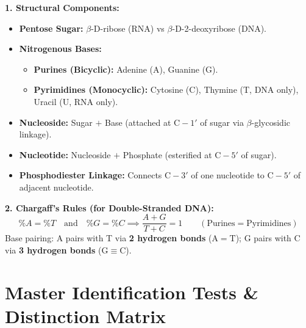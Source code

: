 \documentclass[10pt,a4paper]{article}
\begin{document}
\begin{formulabox}
\textbf{1. Structural Components:}
\begin{itemize}
  \item \textbf{Pentose Sugar:} $\beta$-D-ribose (RNA) vs $\beta$-D-2-deoxyribose (DNA).
  \item \textbf{Nitrogenous Bases:}
  \begin{itemize}
    \item \textbf{Purines (Bicyclic):} Adenine (A), Guanine (G).
    \item \textbf{Pyrimidines (Monocyclic):} Cytosine (C), Thymine (T, DNA only), Uracil (U, RNA only).
  \end{itemize}
  \item \textbf{Nucleoside:} Sugar $+$ Base (attached at $\mathrm{C-1'}$ of sugar via $\beta$-glycosidic linkage).
  \item \textbf{Nucleotide:} Nucleoside $+$ Phosphate (esterified at $\mathrm{C-5'}$ of sugar).
  \item \textbf{Phosphodiester Linkage:} Connects $\mathrm{C-3'}$ of one nucleotide to $\mathrm{C-5'}$ of adjacent nucleotide.
\end{itemize}
\textbf{2. Chargaff's Rules (for Double-Stranded DNA):}
\begin{equation}
  \%A = \%T \quad \text{and} \quad \%G = \%C \implies \frac{A+G}{T+C} = 1 \qquad (\text{Purines} = \text{Pyrimidines})
\end{equation}
Base pairing: A pairs with T via \textbf{2 hydrogen bonds} ($\mathrm{A=T}$); G pairs with C via \textbf{3 hydrogen bonds} ($\mathrm{G\equiv C}$).
\end{formulabox}

\section{Master Identification Tests \& Distinction Matrix}
\end{document}
